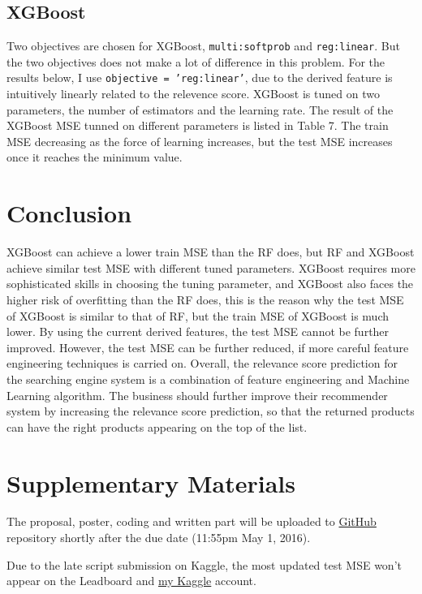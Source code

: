 \documentclass[11pt, titlepage]{article}
\begin{document}
\subsection{XGBoost}

Two objectives are chosen for XGBoost, \texttt{multi:softprob} and \texttt{reg:linear}. But the two objectives does not make a lot of difference in this problem. For the results below, I use \texttt{objective = 'reg:linear'}, due to the derived feature is intuitively linearly related to the relevence score. XGBoost is tuned on two parameters, the number of estimators and the learning rate. The result of the XGBoost MSE tunned on different parameters is listed in Table 7. The train MSE decreasing as the force of learning increases, but the test MSE increases once it reaches the minimum value.



\section{Conclusion}

XGBoost can achieve a lower train MSE than the RF does, but RF and XGBoost achieve similar test MSE with different tuned parameters. XGBoost requires more sophisticated skills in choosing the tuning parameter, and XGBoost also faces the higher risk of overfitting than the RF does, this is the reason why the test MSE of XGBoost is similar to that of RF, but the train MSE of XGBoost is much lower. By using the current derived features, the test MSE cannot be further improved. However, the test MSE can be further reduced, if more careful feature engineering techniques is carried on. Overall, the relevance score prediction for the searching engine system is a combination of feature engineering and Machine Learning algorithm. The business should further improve their recommender system by increasing the relevance score prediction, so that the returned products can have the right products appearing on the top of the list.
 

\section*{Supplementary Materials}

The proposal, poster, coding and written part will be uploaded to \href{<https://github.com/shijbian/STA571_Final_Project}{GitHub} repository shortly after the due date (11:55pm May 1, 2016).

\vspace{3mm} 
\noindent 
Due to the late script submission on Kaggle, the most updated test MSE won't appear on the Leadboard and \href{<https://www.kaggle.com/shijiabian}{my Kaggle} account. 
\end{document}
